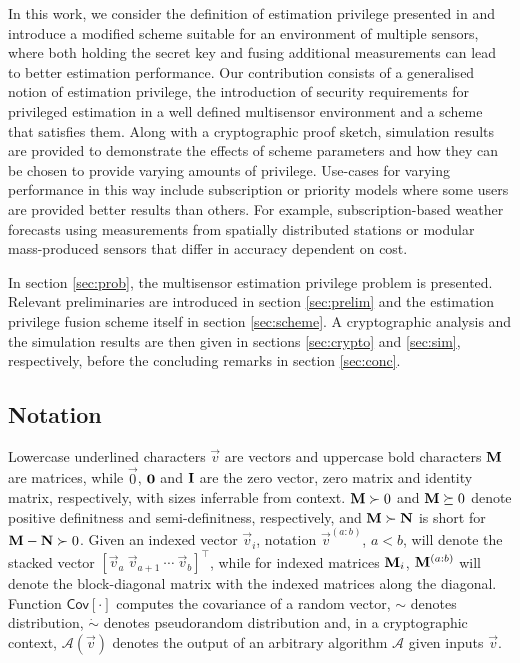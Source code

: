 \documentclass[conference]{IEEEtran}
\theoremstyle{definition}
\theoremstyle{remark}
\begin{document}
In this work, we consider the definition of estimation privilege presented in \cite{risticCryptographicallyPrivilegedState2022} and introduce a modified scheme suitable for an environment of multiple sensors, where both holding the secret key and fusing additional measurements can lead to better estimation performance. Our contribution consists of a generalised notion of estimation privilege, the introduction of security requirements for privileged estimation in a well defined multisensor environment and a scheme that satisfies them. Along with a cryptographic proof sketch, simulation results are provided to demonstrate the effects of scheme parameters and how they can be chosen to provide varying amounts of privilege. Use-cases for varying performance in this way include subscription or priority models where some users are provided better results than others. For example, subscription-based weather forecasts using measurements from spatially distributed stations or modular mass-produced sensors that differ in accuracy dependent on cost.

In section \ref{sec:prob}, the multisensor estimation privilege problem is presented. Relevant preliminaries are introduced in section \ref{sec:prelim} and the estimation privilege fusion scheme itself in section \ref{sec:scheme}. A cryptographic analysis and the simulation results are then given in sections \ref{sec:crypto} and \ref{sec:sim}, respectively, before the concluding remarks in section \ref{sec:conc}.

% 
% 

\subsection{Notation}\label{subsec:notation}
Lowercase underlined characters $\vec{v}$ are vectors and uppercase bold characters ${{\mathbf{M}}}$ are matrices, while $\vec{0}$, ${{\mathbf{0}}}$ and ${{\mathbf{I}}}$ are the zero vector, zero matrix and identity matrix, respectively, with sizes inferrable from context. ${{\mathbf{M}}}\succ 0$ and ${{\mathbf{M}}}\succeq 0$ denote positive definitness and semi-definitness, respectively, and ${{\mathbf{M}}}\succ {\ensuremath{{\mathbf{N}}}}$ is short for ${{\mathbf{M}}} - {{\mathbf{N}}} \succ 0$. Given an indexed vector $\vec{v}_i$, notation $\vec{v}^{(a:b)}$, $a<b$, will denote the stacked vector $[\vec{v}_a\ \vec{v}_{a+1}\ \cdots\ \vec{v}_b]^\top$, while for indexed matrices ${{\mathbf{M}}}_i$, ${{\mathbf{M}}}^{(a:b)}$ will denote the block-diagonal matrix with the indexed matrices along the diagonal. Function $\mathsf{Cov}[\cdot]$ computes the covariance of a random vector, $\sim$ denotes distribution, $\dot{\sim}$ denotes pseudorandom distribution and, in a cryptographic context, $\mathcal{A}(\vec{v})$ denotes the output of an arbitrary algorithm $\mathcal{A}$ given inputs $\vec{v}$.
\end{document}
